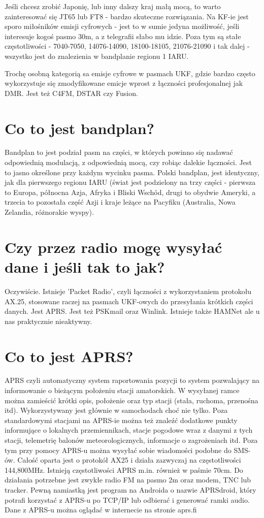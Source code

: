 \documentclass[a4paper,12pt]{article}
\begin{document}
Jeśli chcesz zrobić Japonię, lub inny dalszy kraj małą mocą, to warto zainteresować się JT65 lub FT8 - bardzo skuteczne rozwiązania. Na KF-ie jest sporo miłośników emisji cyfrowych - jest to w sumie jedyna możliwość, jeśli interesuje kogoś pasmo 30m, a z telegrafii słabo mu idzie. Poza tym są stałe częstotliwości - 7040-7050, 14076-14090, 18100-18105, 21076-21090 i tak dalej - wszystko jest do znalezienia w bandplanie regionu 1 IARU.

Trochę osobną kategorią sa emisje cyfrowe w pasmach UKF, gdzie bardzo często wykorzystuje się zmodyfikowane emicje wprost z łączności profesjonalnej jak DMR. Jest też C4FM, DSTAR czy Fusion.

\section{Co to jest bandplan?}
Bandplan to jest podział pasm na części, w których powinno się nadawać odpowiednią modulacją, z odpowiednią mocą, czy robiąc dalekie łączności. Jest to jasno określone przy każdym wycinku pasma. 
Polski bandplan, jest identyczny, jak dla pierwszego regionu IARU (świat jest podzielony na trzy części - pierwsza to Europa, północna Azja, Afryka i Bliski Wschód, drugi to obydwie Ameryki, a trzecia to pozostała część Azji i kraje leżące na Pacyfiku (Australia, Nowa Zelandia, różnorakie wyspy).

\section{Czy przez radio mogę wysyłać dane i jeśli tak to jak?}
Oczywiście. Istnieje 'Packet Radio', czyli łączności z wykorzystaniem protokołu AX.25, stosowane raczej na pasmach UKF-owych do przesyłania krótkich części danych.
Jest APRS.
Jest też PSKmail oraz Winlink.
Istnieje także HAMNet ale u nas praktycznie nieaktywny.

\section{Co to jest APRS?}
APRS czyli automatyczny system raportowania pozycji to system pozwalający na informowanie o bieżącym położeniu stacji amatorskich. W wysyłanej ramce można zamieścić krótki opis, położenie oraz typ stacji (stała, ruchoma, przenośna itd). Wykorzystywany jest głównie w samochodach choć nie tylko. Poza standardowymi stacjami na APRS-ie można też znaleźć dodatkowe punkty informujące o lokalnych przemiennikach, stacje pogodowe wraz z danymi z tych stacji, telemetrię balonów meteorologicznych, informacje o zagrożeniach itd. 
Poza tym przy pomocy APRS-u można wysyłać sobie wiadomości podobne do SMS-ów.
Całość oparta jest o protokół AX25 i działa zazwyczaj na częstotliwości 144,800MHz. Istnieją częstotliwości APRS m.in. również w paśmie 70cm.
Do działania potrzebne jest zwykłe radio FM na pasmo 2m oraz modem, TNC lub tracker. 
Pewną namiastką jest program na Androida o nazwie APRSdroid, który potrafi korzystać z APRS-u po TCP/IP lub odbierać i generować ramki audio.
Dane z APRS-u można oglądać w internecie na stronie aprs.fi
\end{document}
